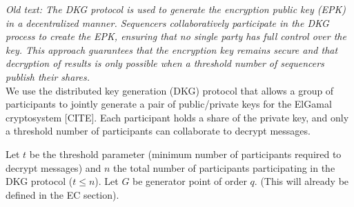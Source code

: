 \textit{Old text: The DKG protocol is used to generate the encryption public key (EPK) in a decentralized manner. Sequencers collaboratively participate in the DKG process to create the EPK, ensuring that no single party has full control over the key. This approach guarantees that the encryption key remains secure and that decryption of results is only possible when a threshold number of sequencers publish their shares.}\\

We use the distributed key generation (DKG) protocol that allows a group of participants to jointly generate a pair of public/private keys for the ElGamal cryptosystem [CITE]. Each participant holds a share of the private key, and only a threshold number of participants can collaborate to decrypt messages. 


Let $t$ be the threshold parameter (minimum number of participants required to decrypt messages) and $n$ the total number of participants participating in the DKG protocol ($t \leq n$). Let $G$ be generator point of order $q$. (This will already be defined in the EC section).

